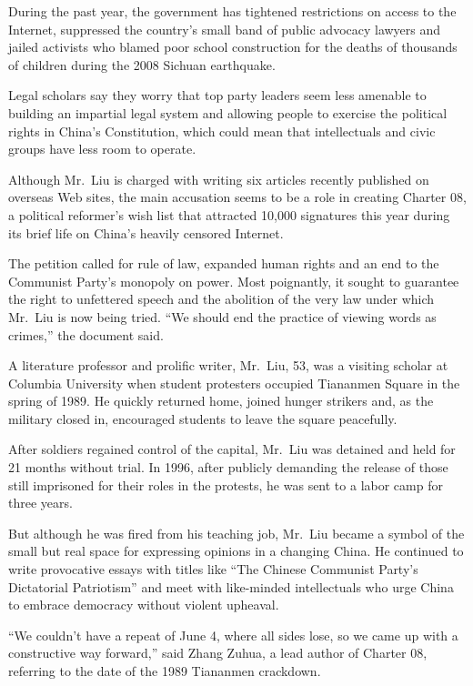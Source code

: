﻿\documentclass[12pt]{article}
\begin{document}
During the past year, the government has tightened restrictions on access to the Internet,
suppressed the country's small band of public advocacy lawyers and jailed activists who blamed poor
school construction for the deaths of thousands of children during the 2008 Sichuan earthquake.

Legal scholars say they worry that top party leaders seem less amenable to building an impartial
legal system and allowing people to exercise the political rights in China's Constitution, which
could mean that intellectuals and civic groups have less room to operate.

Although Mr.~Liu is charged with writing six articles recently published on overseas Web sites, the
main accusation seems to be a role in creating Charter 08, a political reformer's wish list that
attracted 10,000 signatures this year during its brief life on China's heavily censored Internet.

The petition called for rule of law, expanded human rights and an end to the Communist Party's
monopoly on power. Most poignantly, it sought to guarantee the right to unfettered speech and the
abolition of the very law under which Mr.~Liu is now being tried. ``We should end the practice of
viewing words as crimes,'' the document said.

A literature professor and prolific writer, Mr.~Liu, 53, was a visiting scholar at Columbia
University when student protesters occupied Tiananmen Square in the spring of 1989. He quickly
returned home, joined hunger strikers and, as the military closed in, encouraged students to leave
the square peacefully.

After soldiers regained control of the capital, Mr.~Liu was detained and held for 21 months without
trial. In 1996, after publicly demanding the release of those still imprisoned for their roles in
the protests, he was sent to a labor camp for three years.

But although he was fired from his teaching job, Mr.~Liu became a symbol of the small but real space
for expressing opinions in a changing China. He continued to write provocative essays with titles
like ``The Chinese Communist Party's Dictatorial Patriotism'' and meet with like-minded
intellectuals who urge China to embrace democracy without violent upheaval.

``We couldn't have a repeat of June 4, where all sides lose, so we came up with a constructive way
forward,'' said Zhang Zuhua, a lead author of Charter 08, referring to the date of the 1989
Tiananmen crackdown.
\end{document}
